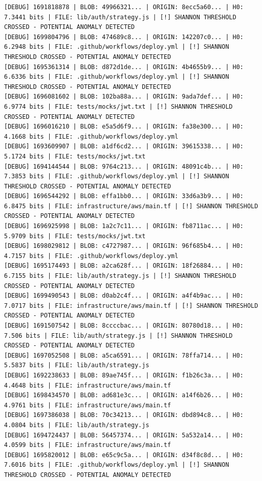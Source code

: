 \documentclass[12pt, a4paper, oneside]{report}
\begin{document}
\begin{lstlisting}[basicstyle=\tiny\ttfamily]
[DEBUG] 1691818878 | BLOB: 49966321... | ORIGIN: 8ecc5a60... | H0: 7.3441 bits | FILE: lib/auth/strategy.js | [!] SHANNON THRESHOLD CROSSED - POTENTIAL ANOMALY DETECTED
[DEBUG] 1699804796 | BLOB: 474689c8... | ORIGIN: 142207c0... | H0: 6.2948 bits | FILE: .github/workflows/deploy.yml | [!] SHANNON THRESHOLD CROSSED - POTENTIAL ANOMALY DETECTED
[DEBUG] 1695361314 | BLOB: d872d1de... | ORIGIN: 4b4655b9... | H0: 6.6336 bits | FILE: .github/workflows/deploy.yml | [!] SHANNON THRESHOLD CROSSED - POTENTIAL ANOMALY DETECTED
[DEBUG] 1696081602 | BLOB: 102ba88a... | ORIGIN: 9ada7def... | H0: 6.9774 bits | FILE: tests/mocks/jwt.txt | [!] SHANNON THRESHOLD CROSSED - POTENTIAL ANOMALY DETECTED
[DEBUG] 1696016210 | BLOB: e5a5d6f9... | ORIGIN: fa38e300... | H0: 4.1668 bits | FILE: .github/workflows/deploy.yml
[DEBUG] 1693609907 | BLOB: a1df6cd2... | ORIGIN: 39615338... | H0: 5.1724 bits | FILE: tests/mocks/jwt.txt
[DEBUG] 1694144544 | BLOB: 9764c213... | ORIGIN: 48091c4b... | H0: 7.3853 bits | FILE: .github/workflows/deploy.yml | [!] SHANNON THRESHOLD CROSSED - POTENTIAL ANOMALY DETECTED
[DEBUG] 1696544292 | BLOB: effa1bb0... | ORIGIN: 33d6a3b9... | H0: 6.8475 bits | FILE: infrastructure/aws/main.tf | [!] SHANNON THRESHOLD CROSSED - POTENTIAL ANOMALY DETECTED
[DEBUG] 1696925998 | BLOB: 1a2c7c11... | ORIGIN: fb8711ac... | H0: 5.9709 bits | FILE: tests/mocks/jwt.txt
[DEBUG] 1698029812 | BLOB: c4727987... | ORIGIN: 96f685b4... | H0: 4.7157 bits | FILE: .github/workflows/deploy.yml
[DEBUG] 1695174493 | BLOB: a2ca628f... | ORIGIN: 18f26884... | H0: 6.7155 bits | FILE: lib/auth/strategy.js | [!] SHANNON THRESHOLD CROSSED - POTENTIAL ANOMALY DETECTED
[DEBUG] 1699490543 | BLOB: d0ab2c4f... | ORIGIN: a4f4b9ac... | H0: 7.0717 bits | FILE: infrastructure/aws/main.tf | [!] SHANNON THRESHOLD CROSSED - POTENTIAL ANOMALY DETECTED
[DEBUG] 1691507542 | BLOB: 8ccccbac... | ORIGIN: 80780d18... | H0: 7.506 bits | FILE: lib/auth/strategy.js | [!] SHANNON THRESHOLD CROSSED - POTENTIAL ANOMALY DETECTED
[DEBUG] 1697052508 | BLOB: a5ca6591... | ORIGIN: 78ffa714... | H0: 5.5837 bits | FILE: lib/auth/strategy.js
[DEBUG] 1692238633 | BLOB: 89ae745f... | ORIGIN: f1b26c3a... | H0: 4.4648 bits | FILE: infrastructure/aws/main.tf
[DEBUG] 1698434570 | BLOB: ad681e3c... | ORIGIN: a14f6b26... | H0: 4.9761 bits | FILE: infrastructure/aws/main.tf
[DEBUG] 1697386038 | BLOB: 70c34213... | ORIGIN: dbd894c8... | H0: 4.0804 bits | FILE: lib/auth/strategy.js
[DEBUG] 1694724437 | BLOB: 56457374... | ORIGIN: 5a532a14... | H0: 4.0599 bits | FILE: infrastructure/aws/main.tf
[DEBUG] 1695820012 | BLOB: e65c9c5a... | ORIGIN: d34f8c8d... | H0: 7.6016 bits | FILE: .github/workflows/deploy.yml | [!] SHANNON THRESHOLD CROSSED - POTENTIAL ANOMALY DETECTED

\end{lstlisting}
\end{document}
